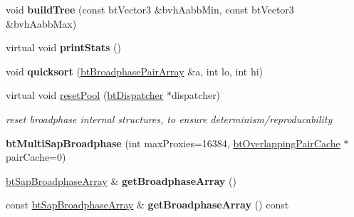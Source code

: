 \begin{DoxyCompactItemize}
\item 
\mbox{\label{classbtMultiSapBroadphase_a2ab67fb07b7e1d4af1fbd46458bc7710}} 
void {\bfseries build\+Tree} (const bt\+Vector3 \&bvh\+Aabb\+Min, const bt\+Vector3 \&bvh\+Aabb\+Max)
\item 
\mbox{\label{classbtMultiSapBroadphase_a9a2c086a64d8533cb92f3c3715c008ab}} 
virtual void {\bfseries print\+Stats} ()
\item 
\mbox{\label{classbtMultiSapBroadphase_a873d57f7b14c9dcb773007e07510a3a3}} 
void {\bfseries quicksort} (\hyperlink{classbtAlignedObjectArray}{bt\+Broadphase\+Pair\+Array} \&a, int lo, int hi)
\item 
\mbox{\label{classbtMultiSapBroadphase_a41e51be9bbe1104bd14ba98eca5aa621}} 
virtual void \hyperlink{classbtMultiSapBroadphase_a41e51be9bbe1104bd14ba98eca5aa621}{reset\+Pool} (\hyperlink{classbtDispatcher}{bt\+Dispatcher} $\ast$dispatcher)
\begin{DoxyCompactList}\small\item\em reset broadphase internal structures, to ensure determinism/reproducability \end{DoxyCompactList}\item 
\mbox{\label{classbtMultiSapBroadphase_ac950811ea4dc8e9798165f08cd2a1519}} 
{\bfseries bt\+Multi\+Sap\+Broadphase} (int max\+Proxies=16384, \hyperlink{classbtOverlappingPairCache}{bt\+Overlapping\+Pair\+Cache} $\ast$pair\+Cache=0)
\item 
\mbox{\label{classbtMultiSapBroadphase_a6b867c146b6ad6c9e986a1ff09ec52b2}} 
\hyperlink{classbtAlignedObjectArray}{bt\+Sap\+Broadphase\+Array} \& {\bfseries get\+Broadphase\+Array} ()
\item 
\mbox{\label{classbtMultiSapBroadphase_aa685c49def5d65691720dcd2ae974683}} 
const \hyperlink{classbtAlignedObjectArray}{bt\+Sap\+Broadphase\+Array} \& {\bfseries get\+Broadphase\+Array} () const
\item 
\mbox{\label{classbtMultiSapBroadphase_a2b0c783f3ef6f44768130d8f1a46efc1}} 

\end{DoxyCompactItemize}
